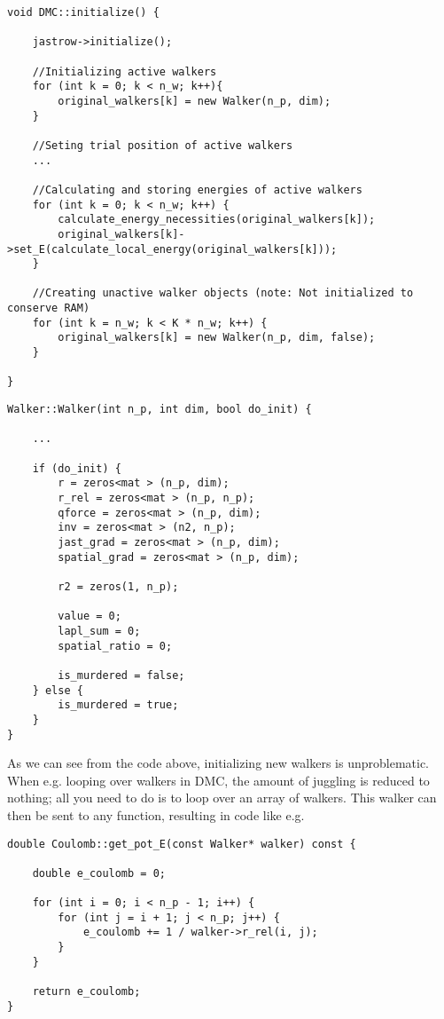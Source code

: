 \begin{lstlisting}
void DMC::initialize() {

    jastrow->initialize();

    //Initializing active walkers
    for (int k = 0; k < n_w; k++){
        original_walkers[k] = new Walker(n_p, dim);
    }
    
    //Seting trial position of active walkers
    ...

    //Calculating and storing energies of active walkers
    for (int k = 0; k < n_w; k++) {
        calculate_energy_necessities(original_walkers[k]);
        original_walkers[k]->set_E(calculate_local_energy(original_walkers[k]));
    }

    //Creating unactive walker objects (note: Not initialized to conserve RAM) 
    for (int k = n_w; k < K * n_w; k++) {
        original_walkers[k] = new Walker(n_p, dim, false);
    }

}
\end{lstlisting}

\begin{lstlisting}
Walker::Walker(int n_p, int dim, bool do_init) {
    
    ...
    
    if (do_init) {
        r = zeros<mat > (n_p, dim);
        r_rel = zeros<mat > (n_p, n_p);
        qforce = zeros<mat > (n_p, dim);
        inv = zeros<mat > (n2, n_p);
        jast_grad = zeros<mat > (n_p, dim);
        spatial_grad = zeros<mat > (n_p, dim);

        r2 = zeros(1, n_p);

        value = 0;
        lapl_sum = 0;
        spatial_ratio = 0;

        is_murdered = false;
    } else {
        is_murdered = true;
    }
}
\end{lstlisting}

As we can see from the code above, initializing new walkers is unproblematic. When e.g. looping over walkers in DMC, the amount of juggling is reduced to nothing; all you need to do is to loop over an array of walkers. This walker can then be sent to any function, resulting in code like e.g.

\vspace{0.5cm}
\begin{lstlisting}
double Coulomb::get_pot_E(const Walker* walker) const {
    
    double e_coulomb = 0;

    for (int i = 0; i < n_p - 1; i++) {
        for (int j = i + 1; j < n_p; j++) {
            e_coulomb += 1 / walker->r_rel(i, j);
        }
    }

    return e_coulomb;
}
\end{lstlisting}

